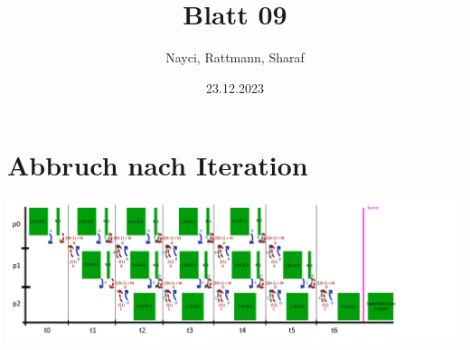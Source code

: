 \documentclass[a4paper,10pt,landscape]{article}
\title{Blatt 09}
\author{Nayci, Rattmann, Sharaf}
\date{23.12.2023}
\begin{document}
\maketitle

\section*{Abbruch nach Iteration}
\includegraphics[width=25cm]{gs_iter.png}
\newpage
\end{document}

